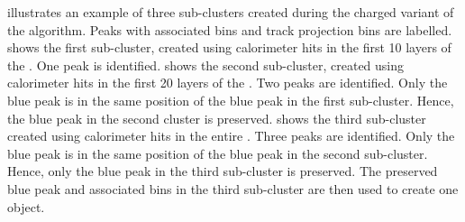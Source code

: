 
 illustrates an example of three sub-clusters created during the charged variant of the \peakFinding algorithm. Peaks with associated bins and track projection bins are labelled.  shows the first sub-cluster, created using calorimeter hits  in the first 10 layers of the \ECAL. One peak is identified.  shows the second sub-cluster, created using calorimeter hits in the first 20 layers of the \ECAL. Two peaks are identified. Only the blue peak is in the same position of the blue peak in the first sub-cluster. Hence, the blue peak in the second cluster is preserved.  shows the third sub-cluster created using calorimeter hits in the entire \ECAL. Three peaks are identified. Only the blue  peak is in the  same position of the blue peak in the second sub-cluster. Hence, only the blue  peak in the third sub-cluster is preserved. The preserved blue peak and associated bins in the third sub-cluster are then used to create one \ShowerPeak object.


